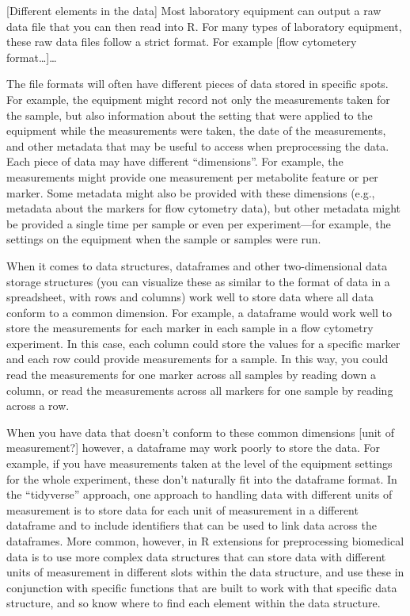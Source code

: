 \documentclass[]{tufte-book}
\begin{document}
{[}Different elements in the data{]}
Most laboratory equipment can output a raw data file that you can then read into R.
For many types of laboratory equipment, these raw data files follow a strict format.
For example {[}flow cytometery format\ldots{]}\ldots{}

The file formats will often have different pieces of data stored in specific spots.
For example, the equipment might record not only the measurements taken for the
sample, but also information about the setting that were applied to the equipment
while the measurements were taken, the date of the measurements, and other metadata
that may be useful to access when preprocessing the data. Each piece of data may
have different ``dimensions''. For example, the measurements might provide one
measurement per metabolite feature or per marker. Some metadata might also be
provided with these dimensions (e.g., metadata about the markers for flow
cytometry data), but other metadata might be provided a single time per sample
or even per experiment---for example, the settings on the equipment when the
sample or samples were run.

When it comes to data structures, dataframes and other two-dimensional data storage
structures (you can visualize these as similar to the format of data in a spreadsheet,
with rows and columns) work well to store data where all data conform to a common
dimension. For example, a dataframe would work well to store the measurements
for each marker in each sample in a flow cytometry experiment. In this case,
each column could store the values for a specific marker and each row could
provide measurements for a sample. In this way, you could read the measurements
for one marker across all samples by reading down a column, or read the measurements
across all markers for one sample by reading across a row.

When you have data that doesn't conform to these common dimensions {[}unit of
measurement?{]} however, a dataframe may work poorly to store the data. For
example, if you have measurements taken at the level of the equipment settings
for the whole experiment, these don't naturally fit into the dataframe format.
In the ``tidyverse'' approach, one approach to handling data with different units
of measurement is to store data for each unit of measurement in a different
dataframe and to include identifiers that can be used to link data across the
dataframes. More common, however, in R extensions for preprocessing biomedical
data is to use more complex data structures that can store data with different
units of measurement in different slots within the data structure, and use these
in conjunction with specific functions that are built to work with that specific
data structure, and so know where to find each element within the data
structure.
\end{document}
